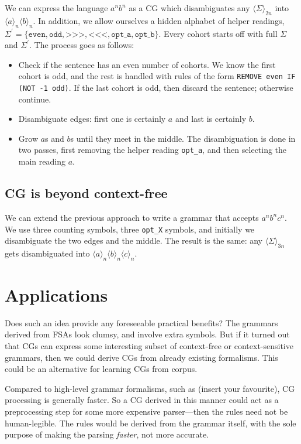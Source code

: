 \documentclass[11pt]{article}
\def\t#1{\texttt{#1}}
\def\maxAmb#1{$\langle \Sigma \rangle_#1$}
\def\maxAmbCFG#1{$\langle \Sigma,\Sigma^{\prime} \rangle_#1$}
\begin{document}
We can express the language $a^nb^n$ as a CG which disambiguates
any \maxAmb{{2n}} into $\langle a \rangle_n \langle b \rangle_n$.
In addition, we allow ourselves a hidden alphabet of helper readings, 
$\Sigma^{\prime} = \{\t{even}, \t{odd}, \t{>>>}, \t{<<<}, \t{opt\_a}, \t{opt\_b}\}$. 
Every cohort starts off with full $\Sigma$ and $\Sigma^{\prime}$.
The process goes as follows:
\begin{itemize}
\item Check if the sentence has an even number of cohorts. We know the first cohort
      is odd, and the rest is handled with rules of the form \t{REMOVE even IF (NOT -1 odd)}.
      If the last cohort is odd, then discard the sentence; otherwise continue.
\item Disambiguate edges: first one is certainly $a$ and last is certainly $b$.
\item Grow $a$s and $b$s until they meet in the middle. The disambiguation is done in two 
      passes, first removing the helper reading \t{opt\_a}, and then selecting the main reading $a$.
\end{itemize}

\subsection{CG is beyond context-free}

We can extend the previous approach to write a grammar that accepts $a^nb^nc^n$.
We use three counting symbols, three \t{opt\_X} symbols, and initially we disambiguate
the two edges and the middle. The result is the same: any \maxAmb{{3n}} gets disambiguated
into $\langle a \rangle_n \langle b \rangle_n \langle c \rangle_n$.


\section{Applications}

Does such an idea provide any foreseeable practical benefits?
The grammars derived from FSAs look clumsy, and involve extra symbols.
But if it turned out that CGs can express some interesting subset of context-free 
or context-sensitive grammars, then we could derive CGs from already existing formalisms.
This could be an alternative for learning CGs from corpus.

Compared to high-level grammar formalisms, such as (insert your favourite), CG processing
is generally faster. So a CG derived in this manner could act as a preprocessing step 
for some more expensive parser---then the rules need not be human-legible. 
The rules would be derived from the grammar itself, with the sole purpose of 
making the parsing \emph{faster}, not more accurate.











\end{document}
